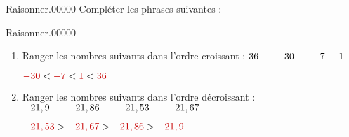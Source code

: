 \documentclass[a4paper,dvipsnames,french,10pt]{book}
\begin{document}
\begin{pageParcoursu} %

\begin{ExoCuN}{Raisonner.}{0}{0}{0}{0}{0}
Compléter les phrases suivantes :


\end{ExoCuN}

\begin{ExoCuN}{Raisonner.}{0}{0}{0}{0}{0}
\begin{enumerate}
 \item Ranger les nombres suivants dans l'ordre croissant : $36 \hspace{.5cm} -30 \hspace{.5cm} -7 \hspace{.5cm} 1$ \vspace{.2cm}

\begin{center}
$\textcolor{red}{-30}<\textcolor{red}{-7}<\textcolor{red}{1}<\textcolor{red}{36}$
\end{center}


 \item Ranger les nombres suivants dans l'ordre décroissant : $-21,9 \hspace{.5cm} -21,86 \hspace{.5cm} -21,53 \hspace{.5cm} -21,67$ \vspace{.2cm}
 
\begin{center}
$\textcolor{red}{-21,53}>\textcolor{red}{-21,67}>\textcolor{red}{-21,86}>\textcolor{red}{-21,9}$
\end{center}


\end{enumerate}
\end{ExoCuN}
\end{pageParcoursu}
\end{document}
